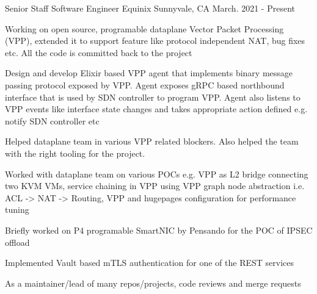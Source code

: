 

\begin{cventries}

  \cventry
    {Senior Staff Software Engineer} %
    {Equinix} %
    {Sunnyvale, CA} %
    {March. 2021 - Present} %
    {
      \begin{cvitems} %
        \item {Working on open source, programable dataplane Vector Packet Processing (VPP), extended it to support feature like protocol independent NAT, bug fixes etc.
               All the code is committed back to the project}
        \item {Design and develop Elixir based VPP agent that implements binary message passing protocol exposed by VPP.
               Agent exposes gRPC based northbound interface that is used by SDN controller to program VPP. Agent also listens to VPP events like interface state changes and
               takes appropriate action defined e.g. notify SDN controller etc}
        \item {Helped dataplane team in various VPP related blockers. Also helped the team with the right tooling for the project.}
        \item {Worked with dataplane team on various POCs e.g. VPP as L2 bridge connecting two KVM VMs, service chaining in VPP using VPP graph node abstraction i.e. ACL -> NAT -> Routing,
               VPP and hugepages configuration for performance tuning}
        \item {Briefly worked on P4 programable SmartNIC by Pensando for the POC of IPSEC offload}
        \item {Implemented Vault based mTLS authentication for one of the REST services}
        \item {As a maintainer/lead of many repos/projects, code reviews and merge requests}
      \end{cvitems}
    }


\end{cventries}
